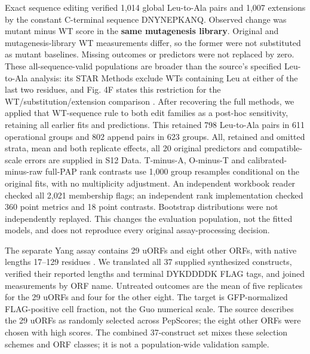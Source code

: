 \documentclass[11pt,a4paper]{article}
\begin{document}
Exact sequence editing verified 1,014 global Leu-to-Ala pairs and 1,007
extensions by the constant C-terminal sequence DNYNEPKANQ. Observed change
was mutant minus WT score in the \textbf{same mutagenesis library}. Original and
mutagenesis-library WT measurements differ, so the former were not substituted
as mutant baselines. Missing outcomes or predictors were not replaced by zero.
These all-sequence-valid populations are broader than the source's specified
Leu-to-Ala analysis: its STAR Methods exclude WTs containing Leu at either
of the last two residues, and Fig. 4F states this restriction for the
WT/substitution/extension comparison \cite{guo}. After recovering the full
methods, we applied that WT-sequence rule to both edit families as a
post-hoc sensitivity, retaining all earlier fits and predictions. This
retained 798 Leu-to-Ala pairs in 611 operational groups and 802 append pairs
in 623 groups. All, retained and omitted strata, mean and both replicate
effects, all 20 original predictors and compatible-scale errors are supplied
in S12 Data. T-minus-A, O-minus-T and calibrated-minus-raw full-PAP rank
contrasts use 1,000 group resamples conditional on the original fits, with
no multiplicity adjustment. An independent workbook reader checked all
2,021 membership flags; an independent rank implementation checked 360 point
metrics and 18 point contrasts. Bootstrap distributions were not independently
replayed. This changes the evaluation population, not the fitted models,
and does not reproduce every original assay-processing decision.

The separate Yang assay contains 29 uORFs and eight other ORFs, with native
lengths 17--129 residues \cite{yang}. We translated all 37 supplied synthesized
constructs, verified their reported lengths and terminal DYKDDDDK FLAG tags,
and joined measurements by ORF name. Untreated outcomes are the mean of five
replicates for the 29 uORFs and four for the other eight. The target is
GFP-normalized FLAG-positive cell fraction, not the Guo numerical scale.
The source describes the 29 uORFs as randomly selected across PepScores;
the eight other ORFs were chosen with high scores. The combined 37-construct
set mixes these selection schemes and ORF classes; it is not a population-wide
validation sample.
\end{document}
